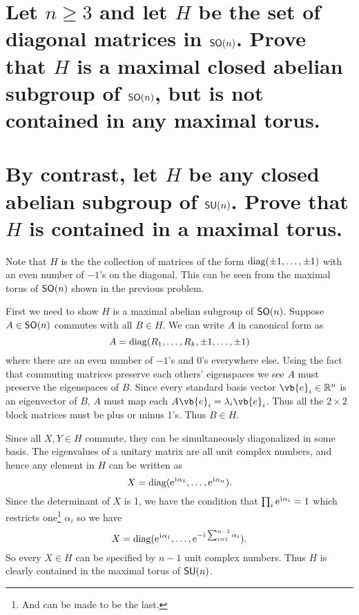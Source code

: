\documentclass[
	pages,
	boxes,
	color=WildStrawberry
]{homework}
\begin{document}
\begin{problem}
\begin{parts}
	\part{Let $n \geq 3$ and let $H$ be the set of diagonal matrices in $\mathsf{SO}(n)$. Prove that $H$ is a maximal closed abelian subgroup of $\mathsf{SO}(n)$, but is not contained in any maximal torus.}\label{part:5a}
	\part{By contrast, let $H$ be any closed abelian subgroup of $\mathsf{SU}(n)$. Prove that $H$ is contained in a maximal torus.}\label{part:5b}
\end{parts}
\end{problem}

\begin{solution}
	\ref{part:5a}
	Note that $H$ is the the collection of matrices of the form $\operatorname{diag}(\pm 1, \ldots, \pm 1)$ with an even number of $-1$'s on the diagonal. This can be seen from the maximal torus of $\mathsf{SO}(n)$ shown in the previous problem.

	First we need to show $H$ is a maximal abelian subgroup of $\mathsf{SO}(n)$. Suppose $A\in\mathsf{SO}(n)$ commutes with all $B\in H$. We can write $A$ in canonical form as
	\begin{equation*}
		A = \operatorname{diag}(R_1,\ldots, R_k, \pm 1, \ldots, \pm 1)
	\end{equation*}
	where there are an even number of $-1$'s and 0's everywhere else. Using the fact that commuting matrices preserve each others' eigenspaces we see $A$ must preserve the eigenspaces of $B$. Since every standard basis vector $\vb{e}_i\in\R^n$ is an eigenvector of $B$, $A$ must map each $A\vb{e}_i = \lambda_i\vb{e}_i$. Thus all the $2\times 2$ block matrices must be plus or minus 1's. Thus $B\in H$.

	\ref{part:5b}
	Since all $X, Y\in H$ commute, they can be simultaneously diagonalized in some basis. The eigenvalues of a unitary matrix are all unit complex numbers, and hence any element in $H$ can be written as
	\begin{equation*}
		X = \operatorname{diag}(\mathrm{e}^{\mkern1mu\mathrm{i}\mkern1mu\alpha_1},\ldots, \mathrm{e}^{\mkern1mu\mathrm{i}\mkern1mu\alpha_n}).
	\end{equation*}
	Since the determinant of $X$ is 1, we have the condition that $\prod_i\mathrm{e}^{\mkern1mu\mathrm{i}\mkern1mu\alpha_i} = 1$ which restricts one\footnote{And can be made to be the last.} $\alpha_i$ so we have
	\begin{equation*}
		X = \operatorname{diag}(\mathrm{e}^{\mkern1mu\mathrm{i}\mkern1mu\alpha_1},\ldots, \mathrm{e}^{-\mkern1mu\mathrm{i}\mkern1mu \sum_{i = 1}^{n-1}\alpha_i}).
	\end{equation*}
	So every $X\in H$ can be specified by $n-1$ unit complex numbers. Thus $H$ is clearly contained in the maximal torus of $\mathsf{SU}(n)$.
\end{solution}
\end{document}
